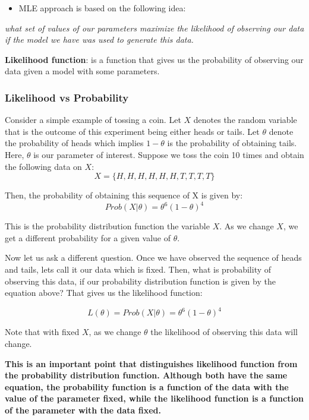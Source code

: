 \documentclass[]{book}
\providecommand{\tightlist}{%
  \setlength{\itemsep}{0pt}\setlength{\parskip}{0pt}}
\theoremstyle{definition}
\theoremstyle{definition}
\theoremstyle{definition}
\theoremstyle{remark}
\begin{document}
\begin{itemize}
\tightlist
\item
  MLE approach is based on the following idea:
\end{itemize}

\emph{what set of values of our parameters maximize the likelihood of
observing our data if the model we have was used to generate this data.}

\textbf{Likelihood function}: is a function that gives us the
probability of observing our data given a model with some parameters.

\hypertarget{likelihood-vs-probability}{%
\subsubsection{Likelihood vs
Probability}\label{likelihood-vs-probability}}

Consider a simple example of tossing a coin. Let \(X\) denotes the
random variable that is the outcome of this experiment being either
heads or tails. Let \(\theta\) denote the probability of heads which
implies \(1-\theta\) is the probability of obtaining tails. Here,
\(\theta\) is our parameter of interest. Suppose we toss the coin 10
times and obtain the following data on \(X\):
\[X=\{H,H,H,H,H,H,T,T,T,T\}\]

Then, the probability of obtaining this sequence of X is given by:
\[Prob (X|\theta)=\theta^6 (1-\theta)^4\]

This is the probability distribution function the variable \(X\). As we
change \(X\), we get a different probability for a given value of
\(\theta\).

Now let us ask a different question. Once we have observed the sequence
of heads and tails, lets call it our data which is fixed. Then, what is
probability of observing this data, if our probability distribution
function is given by the equation above? That gives us the likelihood
function:

\[ L(\theta)=Prob(X|\theta)=\theta^6(1-\theta)^4\]

Note that with fixed \(X\), as we change \(\theta\) the likelihood of
observing this data will change.

\textbf{This is an important point that distinguishes likelihood
function from the probability distribution function. Although both have
the same equation, the probability function is a function of the data
with the value of the parameter fixed, while the likelihood function is
a function of the parameter with the data fixed.}
\end{document}
